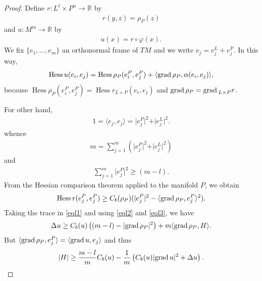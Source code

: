 \documentclass[a4paper]{amsart}
\begin{document}
\begin{proof}
Define $ r : L^{\ell}\times P^{n} \to \mathbb{R} $ by
\begin{eqnarray*}
r(y,z) = \rho_{P}(z)
\end{eqnarray*} 
and $ u : M^m \to \mathbb{R} $ by
\begin{eqnarray*}
u(x) = r\circ \varphi(x).
\end{eqnarray*}
We fix $ \{e_{1},...,e_{m}\} $ an orthonormal frame of $ TM $ and we write $ e_j = e_{j}^{L} + e_{j}^{P} $. In this way,
\begin{eqnarray}\label{eql1}
\operatorname{Hess} u(e_{i},e_{j}) = \operatorname{Hess} \rho_{P}(e_{i}^{P},e_{j}^{P}) + \langle {{{\rm{grad}\,}}} \rho_{P},\alpha(e_{i},e_{j})\rangle ,
\end{eqnarray}
because $ \operatorname{Hess} \rho_{P}(e_{i}^{P},e_{j}^{P}) = \operatorname{Hess} r_{L\times P}(e_{i},e_{j}) $ and $ {{{\rm{grad}\,}}} \rho_{P} = {{{\rm{grad}\,}}}_{L\times P} r $. 

For other hand,
\begin{eqnarray*}
1 = \langle e_{j},e_{j}\rangle = \vert e_{j}^{P}\vert^2 + \vert e_{j}^{L}\vert^2 .
\end{eqnarray*}
whence
\begin{eqnarray*}
m = \sum_{j=1}^{m}\left(\vert e_{j}^{P}\vert^2 + \vert e_{j}^{L}\vert^2 \right)
\end{eqnarray*}
and
\begin{eqnarray}\label{eql2}
\sum_{j=1}^{m}\vert e_{j}^{P}\vert^2 \geq (m-l).
\end{eqnarray}
From the Hessian comparison theorem applied to the manifold $ P $, we obtain
\begin{eqnarray}\label{eql3}
\operatorname{Hess} r(e_{j}^{P},e_{j}^{P}) \geq C_{b}(\rho_{P})(\vert e_{j}^{P}\vert^2 - \langle {{{\rm{grad}\,}}} \rho_{P},e_{j}^{P}\rangle^2).
\end{eqnarray}
Taking the trace in \eqref{eql1} and using \eqref{eql2} and \eqref{eql3}, we have
\begin{eqnarray*}
\Delta u \geq C_{b}(u)\left((m-l) - \vert {{{\rm{grad}\,}}} \rho_{P}\vert^2\right) + m\langle {{{\rm{grad}\,}}} \rho_{P},H\rangle .
\end{eqnarray*}
But $ \langle {{{\rm{grad}\,}}} \rho_{P},e_{j}^{P}\rangle = \langle {{{\rm{grad}\,}}} u,e_j \rangle $ and thus
\begin{eqnarray*}
\vert H\vert \geq \frac{m-l}{m}C_{b}(u) - \frac{1}{m}\left(C_{b}(u)\vert {{{\rm{grad}\,}}} u\vert^2 + \Delta u \right).
\end{eqnarray*}


\end{proof}
\end{document}
